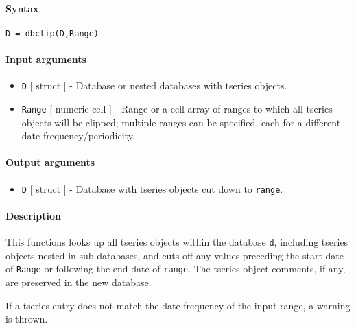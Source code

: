 


	\paragraph{Syntax}\label{syntax}

\begin{verbatim}
D = dbclip(D,Range)
\end{verbatim}

\paragraph{Input arguments}\label{input-arguments}

\begin{itemize}
\item
  \texttt{D} {[} struct {]} - Database or nested databases with tseries
  objects.
\item
  \texttt{Range} {[} numeric \textbar{} cell {]} - Range or a cell array
  of ranges to which all tseries objects will be clipped; multiple
  ranges can be specified, each for a different date
  frequency/periodicity.
\end{itemize}

\paragraph{Output arguments}\label{output-arguments}

\begin{itemize}
\itemsep1pt\parskip0pt
\item
  \texttt{D} {[} struct {]} - Database with tseries objects cut down to
  \texttt{range}.
\end{itemize}

\paragraph{Description}\label{description}

This functions looks up all tseries objects within the database
\texttt{d}, including tseries objects nested in sub-databases, and cuts
off any values preceding the start date of \texttt{Range} or following
the end date of \texttt{range}. The tseries object comments, if any, are
preserved in the new database.

If a tseries entry does not match the date frequency of the input range,
a warning is thrown.

